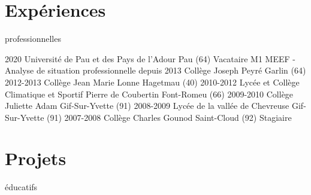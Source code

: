 \documentclass{../cv-style}     %
\begin{document}

\setlength{\parsep}{1ex}
\setlength{\parskip}{1ex}

\vspace{7pt}
\section{Expériences }{professionnelles}
\vspace{-1ex}

\begin{entrylist}
\entry
{2020}
{Université de Pau et des Pays de l'Adour}
{Pau (64)}
{Vacataire M1 MEEF - Analyse de situation professionnelle}
\entry
{depuis 2013}
{Collège Joseph Peyré}
{Garlin (64)}
{\vspace{-3mm}}
\entry
{2012-2013}
{Collège Jean Marie Lonne}
{Hagetmau (40)}
{\vspace{-3mm}}
\entry
{2010-2012}
{Lycée et Collège Climatique et Sportif Pierre de Coubertin}
{Font-Romeu (66)}
{\vspace{-3mm}}
\entry
{2009-2010}
{Collège Juliette Adam}
{Gif-Sur-Yvette (91)}
{\vspace{-3mm}}
\entry
{2008-2009}
{Lycée de la vallée de Chevreuse}
{Gif-Sur-Yvette (91)}
{\vspace{-3mm}}
\entry
{2007-2008}
{Collège Charles Gounod}
{Saint-Cloud (92)}
{Stagiaire}
\end{entrylist}


\vspace{-2ex}
\section{Projets }{éducatifs}
\vspace{-1ex}
\end{document}

